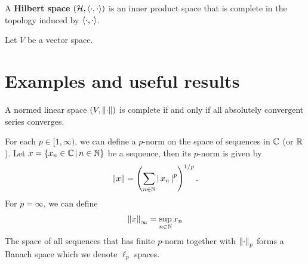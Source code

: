 \documentclass[12pt]{article}
\begin{document}
\begin{fdefinition} A \textbf{Hilbert space} $(\mathcal{H}, \inprod)$ is an inner product space that is complete in the topology induced by $\inprod$. 
\end{fdefinition}

\begin{fdefinition}
\end{fdefinition}

\begin{fdefinition}
\end{fdefinition}



\begin{fdefinition} Let $V$ be a vector space. 
\end{fdefinition}


\section{Examples and useful results}


\begin{flemma} A normed linear space $(V, \norm)$ is complete if and only if all absolutely convergent series converges. 
\end{flemma}

\begin{flemma}
\end{flemma}

\begin{flemma}
\end{flemma}


\begin{ftheorem}
\end{ftheorem}





\begin{mdframed}
\begin{example} For each $p \in [1, \infty)$, we can define a $p$-norm on the space of sequences in $\C$ (or $\R$). Let $x = \set{x_n \in \C \wh n \in \N}$ be a sequence, then its $p$-norm is given by 
\begin{align*}
\norm[ x] = \brac{\sum_{n \in \N} \abs{x_n}^p}^{1/p}. 
\end{align*}
For $p = \infty$, we can define 
\begin{align*}
\norm[x]_\infty = \sup_{n \in \N} x_n
\end{align*}
The space of all sequences that has finite $p$-norm together with $\norm_p$ forms a Banach space which we denote $\ell_p$ spaces. 
\end{example}
\end{mdframed}
\end{document}
